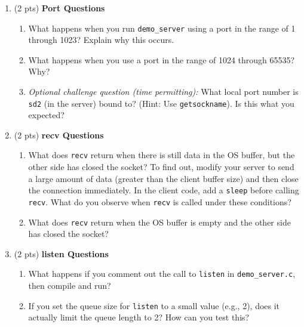\documentclass[12pt]{article}
\begin{document}
\begin{enumerate}[label=Q\arabic*:]
    \item (2 pts) \textbf{Port Questions}
    \begin{enumerate}[label=(\alph*)]
        \item What happens when you run \texttt{demo\_server} using a port in the range of 1 through 1023? Explain why this occurs.
        
        \item What happens when you use a port in the range of 1024 through 65535? Why?
        \item \textit{Optional challenge question (time permitting):} What local port number is \texttt{sd2} (in the server) bound to? (Hint: Use \texttt{getsockname}). Is this what you expected?
    \end{enumerate}

    \item (2 pts) \textbf{recv Questions}
    \begin{enumerate}[label=(\alph*)]
        \item What does \texttt{recv} return when there is still data in the OS buffer, but the other side has closed the socket? To find out, modify your server to send a large amount of data (greater than the client buffer size) and then close the connection immediately. In the client code, add a \texttt{sleep} before calling \texttt{recv}. What do you observe when \texttt{recv} is called under these conditions?

        \item What does \texttt{recv} return when the OS buffer is empty and the other side has closed the socket?
    \end{enumerate}
    
    \item (2 pts) \textbf{listen Questions}
    \begin{enumerate}[label=(\alph*)]
        \item What happens if you comment out the call to \texttt{listen} in \texttt{demo\_server.c}, then compile and run?
        \item If you set the queue size for \texttt{listen} to a small value (e.g., 2), does it actually limit the queue length to 2? How can you test this?
    \end{enumerate}


\end{enumerate}
\end{document}
